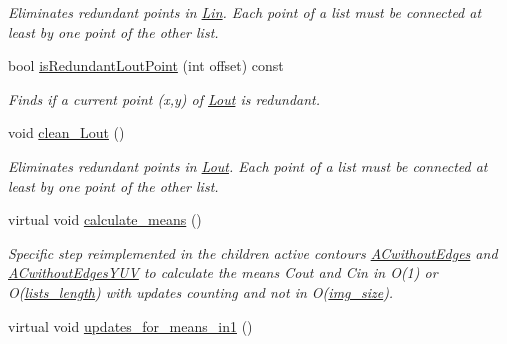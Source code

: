 \begin{DoxyCompactItemize}
\begin{DoxyCompactList}\small\item\em Eliminates redundant points in \hyperlink{classofeli_1_1_active_contour_a7662d4f5c8b87d3e642b08b7e341bd79}{Lin}. Each point of a list must be connected at least by one point of the other list. \end{DoxyCompactList}\item 
bool \hyperlink{classofeli_1_1_active_contour_a9af52a939f0fd059680383b9d087d6fd}{is\-Redundant\-Lout\-Point} (int offset) const 
\begin{DoxyCompactList}\small\item\em Finds if a current point ({\itshape x},{\itshape y}) of \hyperlink{classofeli_1_1_active_contour_a31e0eb18a7ea6ae90acf66ed018fcd85}{Lout} is redundant. \end{DoxyCompactList}\item 
\hypertarget{classofeli_1_1_active_contour_a17cb6f47e07108bff19a8c45b45c01d1}{void \hyperlink{classofeli_1_1_active_contour_a17cb6f47e07108bff19a8c45b45c01d1}{clean\-\_\-\-Lout} ()}\label{classofeli_1_1_active_contour_a17cb6f47e07108bff19a8c45b45c01d1}

\begin{DoxyCompactList}\small\item\em Eliminates redundant points in \hyperlink{classofeli_1_1_active_contour_a31e0eb18a7ea6ae90acf66ed018fcd85}{Lout}. Each point of a list must be connected at least by one point of the other list. \end{DoxyCompactList}\item 
\hypertarget{classofeli_1_1_active_contour_a403ca7b2a7ed233c9b9cec622140ba60}{virtual void \hyperlink{classofeli_1_1_active_contour_a403ca7b2a7ed233c9b9cec622140ba60}{calculate\-\_\-means} ()}\label{classofeli_1_1_active_contour_a403ca7b2a7ed233c9b9cec622140ba60}

\begin{DoxyCompactList}\small\item\em Specific step reimplemented in the children active contours \hyperlink{classofeli_1_1_a_cwithout_edges}{A\-Cwithout\-Edges} and \hyperlink{classofeli_1_1_a_cwithout_edges_y_u_v}{A\-Cwithout\-Edges\-Y\-U\-V} to calculate the means {\itshape Cout} and {\itshape Cin} in {\itshape O(1)} or {\itshape O}(\hyperlink{classofeli_1_1_active_contour_aefe0738d8a43f3981d591a0cc78ed717}{lists\-\_\-length}) with updates counting and not in {\itshape O}(\hyperlink{classofeli_1_1_active_contour_a9182e11132f64d7607fbd19a78f58387}{img\-\_\-size}). \end{DoxyCompactList}\item 
\hypertarget{classofeli_1_1_active_contour_a72746b8ce52b9cf4ca3549ad6b8ef96b}{virtual void \hyperlink{classofeli_1_1_active_contour_a72746b8ce52b9cf4ca3549ad6b8ef96b}{updates\-\_\-for\-\_\-means\-\_\-in1} ()}\label{classofeli_1_1_active_contour_a72746b8ce52b9cf4ca3549ad6b8ef96b}


\end{DoxyCompactItemize}
